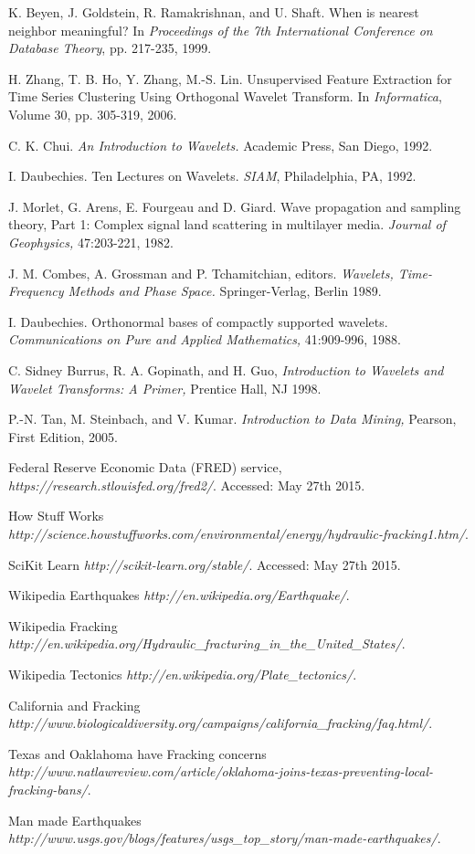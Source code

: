 \documentclass{article}
\begin{document}
\begin{thebibliography}{1}

 K. Beyen, J. Goldstein, R. Ramakrishnan, and U. Shaft. When is nearest neighbor meaningful? In {\em Proceedings of the 7th International Conference on Database Theory}, pp. 217-235, 1999.

 H. Zhang, T. B. Ho, Y. Zhang, M.-S. Lin. Unsupervised Feature Extraction for Time Series Clustering Using Orthogonal Wavelet Transform. In {\em Informatica}, Volume 30, pp. 305-319, 2006.

 C. K. Chui. {\em An Introduction to Wavelets.} Academic Press, San Diego, 1992.

 I. Daubechies. Ten Lectures on Wavelets. {\em SIAM}, Philadelphia, PA, 1992.

 J. Morlet, G. Arens, E. Fourgeau and D. Giard. Wave propagation and sampling theory, Part 1: Complex  signal land scattering in multilayer media. {\em Journal of Geophysics,} 47:203-221, 1982.

 J. M. Combes, A. Grossman and P. Tchamitchian, editors. {\em Wavelets, Time-Frequency Methods and Phase Space.} Springer-Verlag, Berlin 1989.

 I. Daubechies. Orthonormal bases of compactly supported wavelets. {\em Communications on Pure and Applied Mathematics,} 41:909-996, 1988.

 C. Sidney Burrus, R. A. Gopinath, and H. Guo, {\em Introduction to Wavelets and Wavelet Transforms: A Primer,} Prentice Hall, NJ 1998.

 P.-N. Tan, M. Steinbach, and V. Kumar. {\em Introduction to Data Mining,} Pearson, First Edition, 2005.

 Federal Reserve Economic Data (FRED) service, {\em https://research.stlouisfed.org/fred2/}. Accessed: May 27th 2015.

 How Stuff Works {\em http://science.howstuffworks.com/environmental/energy/hydraulic-fracking1.htm/}.

 SciKit Learn {\em http://scikit-learn.org/stable/}. Accessed: May 27th 2015.

 Wikipedia Earthquakes {\em http://en.wikipedia.org/Earthquake/}.

 Wikipedia Fracking {\em http://en.wikipedia.org/Hydraulic\_fracturing\_in\_the\_United\_States/}.

 Wikipedia Tectonics {\em http://en.wikipedia.org/Plate\_tectonics/}.

 California and Fracking {\em http://www.biologicaldiversity.org/campaigns/california\_fracking/faq.html/}.

 Texas and Oaklahoma have Fracking concerns {\em http://www.natlawreview.com/article/oklahoma-joins-texas-preventing-local-fracking-bans/}.

 Man made Earthquakes {\em	http://www.usgs.gov/blogs/features/usgs\_top\_story/man-made-earthquakes/}.

\end{thebibliography}
\end{document}
